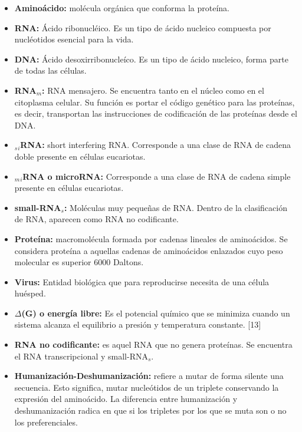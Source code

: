 \begin{itemize}
	\item \textbf{Aminoácido:} molécula orgánica que conforma la proteína.
	\item \textbf{RNA:} Ácido ribonucléico. Es un tipo de ácido nucleico compuesta por nucléotidos esencial para la vida.
	\item \textbf{DNA:} Ácido desoxirribonucleíco. Es un tipo de ácido nucleico, forma parte de todas las células.
	\item \textbf{RNA$_m$:} RNA mensajero. Se encuentra tanto en el núcleo como en el citoplasma celular. Su función es portar el código genético para
							las proteínas, es decir, transportan las instrucciones de codificación de las proteínas desde el DNA.
	\item \textbf{$_s$$_i$RNA:} short interfering RNA. Corresponde a una clase de RNA de cadena doble presente en células eucariotas.
	\item \textbf{$_m$$_i$RNA o microRNA:} Corresponde a una clase de RNA de cadena simple presente en células eucariotas. 
	\item \textbf{small-RNA$_s$:} Moléculas muy pequeñas de RNA. Dentro de la clasificación de RNA, aparecen como RNA no codificante.
	\item \textbf{Proteína:} macromolécula formada por cadenas lineales de aminoácidos. Se considera proteína a aquellas cadenas de aminoácidos  enlazados 								cuyo peso molecular es superior 6000 Daltons.
	\item \textbf{Virus:} Entidad biológica que para reproducirse necesita de una célula huésped.	
	\item \textbf{$\Delta$(G) o energía libre:} Es el potencial químico que se minimiza cuando un sistema alcanza el equilibrio a presión y 								temperatura constante. [13] 
	\item \textbf{RNA no codificante:} es aquel RNA que no genera proteínas. Se encuentra el RNA transcripcional y small-RNA$_s$.
	\item \textbf{Humanización-Deshumanización:} refiere a mutar de forma silente una secuencia. Esto significa, mutar nucleótidos de un triplete 													conservando la expresión del aminoácido. La diferencia entre humanización y deshumanización radica en que 													si los tripletes por los que se muta son o no los preferenciales.				

\end{itemize}
